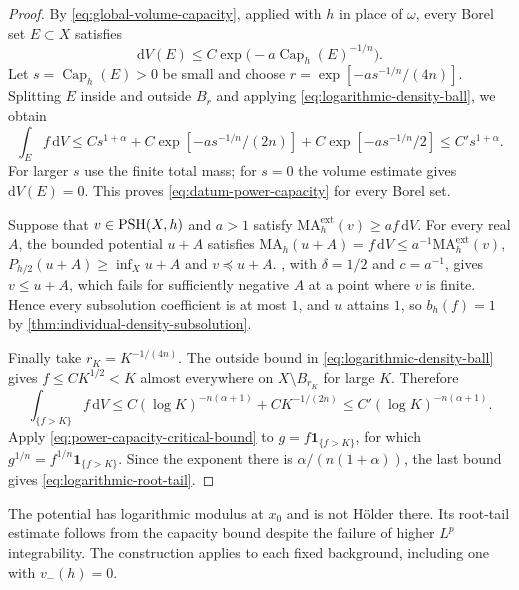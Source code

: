 \begin{proof}
By \eqref{eq:global-volume-capacity}, applied with $h$ in place of $\omega$, every Borel set $E\subset X$ satisfies
\[
 \mathrm dV(E)\leq C\exp\bigl(-a\operatorname{Cap}_h(E)^{-1/n}\bigr).
\]
Let $s=\operatorname{Cap}_h(E)>0$ be small and choose $r=\exp[-as^{-1/n}/(4n)]$. Splitting $E$ inside and outside $B_r$ and applying \eqref{eq:logarithmic-density-ball}, we obtain
\[
 \int_Ef\,\mathrm dV
 \leq Cs^{1+\alpha}
       +C\exp[-as^{-1/n}/(2n)]
       +C\exp[-as^{-1/n}/2]
 \leq C's^{1+\alpha}.
\]
For larger $s$ use the finite total mass; for $s=0$ the volume estimate gives $\mathrm dV(E)=0$. This proves \eqref{eq:datum-power-capacity} for every Borel set.

Suppose that $v\in\mathrm{PSH}(X,h)$ and $a>1$ satisfy $\mathrm{MA}^{\mathrm{ext}}_h(v)\geq af\,\mathrm dV$. For every real $A$, the bounded potential $u+A$ satisfies $\mathrm{MA}_h(u+A)=f\,\mathrm dV\leq a^{-1}\mathrm{MA}^{\mathrm{ext}}_h(v)$, $P_{h/2}(u+A)\geq\inf_Xu+A$ and $v\preceq u+A$. , with $\delta=1/2$ and $c=a^{-1}$, gives $v\leq u+A$, which fails for sufficiently negative $A$ at a point where $v$ is finite. Hence every subsolution coefficient is at most $1$, and $u$ attains $1$, so $b_h(f)=1$ by \cref{thm:individual-density-subsolution}.

Finally take $r_K=K^{-1/(4n)}$. The outside bound in \eqref{eq:logarithmic-density-ball} gives $f\leq CK^{1/2}<K$ almost everywhere on $X\setminus B_{r_K}$ for large $K$. Therefore
\[
 \int_{\{f>K\}}f\,\mathrm dV
 \leq C(\log K)^{-n(\alpha+1)}+CK^{-1/(2n)}
 \leq C'(\log K)^{-n(\alpha+1)}.
\]
Apply \eqref{eq:power-capacity-critical-bound} to $g=f\mathbf1_{\{f>K\}}$, for which $g^{1/n}=f^{1/n}\mathbf1_{\{f>K\}}$. Since the exponent there is $\alpha/(n(1+\alpha))$, the last bound gives \eqref{eq:logarithmic-root-tail}.
\end{proof}

The potential has logarithmic modulus at $x_0$ and is not H\"older there. Its root-tail estimate follows from the capacity bound despite the failure of higher $L^p$ integrability. The construction applies to each fixed background, including one with $v_-(h)=0$.

